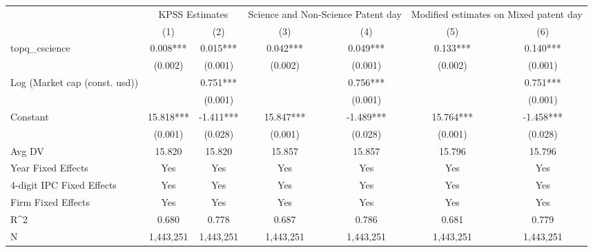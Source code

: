 {
\def\sym#1{\ifmmode^{#1}\else\(^{#1}\)\fi}
\begin{tabular}{l*{6}{c}}
\hline\hline
                    &\multicolumn{2}{c}{KPSS Estimates}&\multicolumn{2}{c}{Science and Non-Science Patent day}&\multicolumn{2}{c}{Modified estimates on Mixed patent day }\\\cmidrule(lr){2-3}\cmidrule(lr){4-5}\cmidrule(lr){6-7}
                    &\multicolumn{1}{c}{(1)}   &\multicolumn{1}{c}{(2)}   &\multicolumn{1}{c}{(3)}   &\multicolumn{1}{c}{(4)}   &\multicolumn{1}{c}{(5)}   &\multicolumn{1}{c}{(6)}   \\
\hline
topq\_cscience       &       0.008***&       0.015***&       0.042***&       0.049***&       0.133***&       0.140***\\
                    &     (0.002)   &     (0.001)   &     (0.002)   &     (0.001)   &     (0.002)   &     (0.001)   \\
Log (Market cap (const. usd))&               &       0.751***&               &       0.756***&               &       0.751***\\
                    &               &     (0.001)   &               &     (0.001)   &               &     (0.001)   \\
Constant            &      15.818***&      -1.411***&      15.847***&      -1.489***&      15.764***&      -1.458***\\
                    &     (0.001)   &     (0.028)   &     (0.001)   &     (0.028)   &     (0.001)   &     (0.028)   \\
\hline
Avg DV              &      15.820   &      15.820   &      15.857   &      15.857   &      15.796   &      15.796   \\
Year Fixed Effects  &         Yes   &         Yes   &         Yes   &         Yes   &         Yes   &         Yes   \\
4-digit IPC Fixed Effects&         Yes   &         Yes   &         Yes   &         Yes   &         Yes   &         Yes   \\
Firm Fixed Effects  &         Yes   &         Yes   &         Yes   &         Yes   &         Yes   &         Yes   \\
R^2                 &       0.680   &       0.778   &       0.687   &       0.786   &       0.681   &       0.779   \\
N                   &   1,443,251   &   1,443,251   &   1,443,251   &   1,443,251   &   1,443,251   &   1,443,251   \\
\hline\hline
\end{tabular}
}
